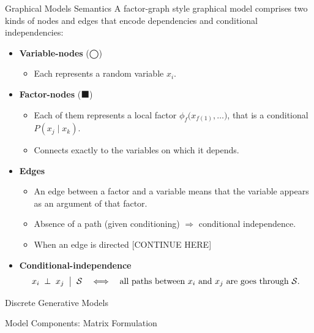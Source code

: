 \documentclass[aspectratio=1610, english]{beamer}
\begin{document}
\begin{frame}{Graphical Models Semantics}
  A factor-graph style graphical model comprises two kinds of nodes and edges that encode dependencies and conditional independencies:
  \begin{itemize}
    \item \textbf{Variable-nodes} (◯)  
      \begin{itemize}
        \item Each represents a random variable \(x_i\).
      \end{itemize}
    \item \textbf{Factor-nodes} (⬛)  
      \begin{itemize}
        \item Each of them represents a local factor \(\phi_f\bigl(x_{f(1)},\dots\bigr)\), that is a conditional \(P(x_j\mid x_k)\).  
        \item Connects exactly to the variables on which it depends.  
      \end{itemize}
    \item \textbf{Edges}  
      \begin{itemize}
        \item An edge between a factor and a variable means that the variable appears as an argument of that factor.  
        \item Absence of a path (given conditioning) $\Rightarrow$ conditional independence.
        \item When an edge is directed [CONTINUE HERE]
      \end{itemize}
    \item \textbf{Conditional-independence}  
      \[
        x_i \;\perp\; x_j 
        \;\bigm|\;
        \mathcal{S}
        \quad\Longleftrightarrow\quad
        \text{all paths between \(x_i\) and \(x_j\) are goes through }\mathcal{S}.
      \]
  \end{itemize}
\end{frame}

\begin{frame}{Discrete Generative Models}

\end{frame}

\begin{frame}{Model Components: Matrix Formulation}

\end{frame}

\end{document}
